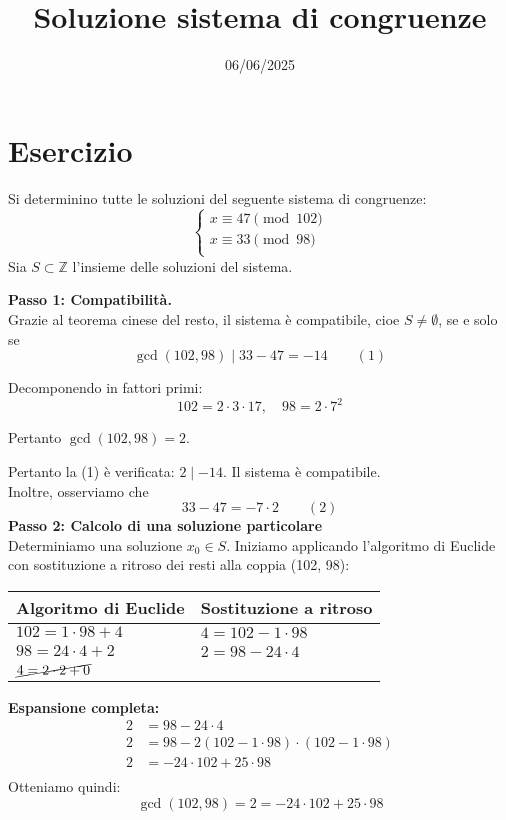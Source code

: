 \documentclass[12pt]{article}
\begin{document}
\title{Soluzione sistema di congruenze}
\date{06/06/2025}
\maketitle
\section*{Esercizio}
Si determinino tutte le soluzioni del seguente sistema di congruenze:
\[
\begin{cases}
x \equiv 47 \pmod{102} \\
x \equiv 33 \pmod{98} \\
\end{cases}
\]
Sia $S \subset \mathbb{Z}$ l'insieme delle soluzioni del sistema.

\textbf{Passo 1: Compatibilità.} \\ 
Grazie al teorema cinese del resto, il sistema è compatibile, cioe $S \neq \emptyset$, se e solo se
$$\gcd(102, 98) \mid 33 - 47 = -14 \qquad (1)$$

Decomponendo in fattori primi:
$$102 = 2 \cdot 3 \cdot 17, \quad 98 = 2 \cdot 7^{2}$$

Pertanto $\gcd(102, 98) = 2$.

Pertanto la (1) è verificata: $2 \mid -14$. Il sistema è compatibile.\\
Inoltre, osserviamo che $$33 - 47 = -7 \cdot 2 \qquad (2)$$
\textbf{Passo 2: Calcolo di una soluzione particolare} \\
Determiniamo una soluzione $x_0 \in S$.
Iniziamo applicando l'algoritmo di Euclide con sostituzione a ritroso dei resti alla coppia (102, 98):
\begin{center}
\setlength{\arrayrulewidth}{0.5pt}
\begin{tabular}{|p{5cm}|p{9cm}|}
\hline
\textbf{Algoritmo di Euclide} & \textbf{Sostituzione a ritroso} \\
\hline
$102 = 1 \cdot  98 + 4$ & $4 = 102 - 1 \cdot  98$ \\
\hline
$98 = 24 \cdot  4 + 2$ & $2 = 98 - 24 \cdot  4$ \\
\hline
$\cancel{4 = 2 \cdot  2 + 0}$ & \\
\hline
\end{tabular}
\end{center}
\textbf{Espansione completa:}
\begin{align*}
2 &= 98 - 24\cdot4\\
2 &= 98 - 2(102 - 1\cdot98)\cdot(102 - 1\cdot98)\\
2 &= -24\cdot102 + 25\cdot98\\
\end{align*}
Otteniamo quindi: $$\gcd(102, 98) = 2 = -24 \cdot 102 + 25 \cdot 98$$
\end{document}

